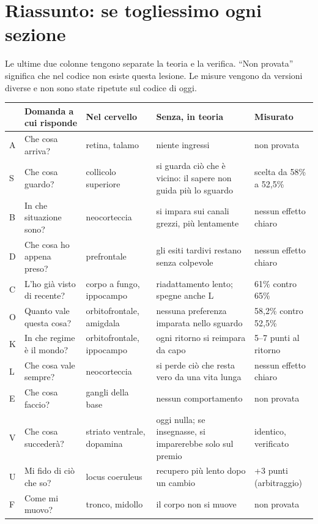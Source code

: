 \documentclass[11pt,a4paper]{article}
\begin{document}
\section{Riassunto: se togliessimo ogni sezione}

Le ultime due colonne tengono separate la teoria e la verifica. ``Non provata'' significa
che nel codice non esiste questa lesione. Le misure vengono da versioni diverse e non sono
state ripetute sul codice di oggi.

\begin{center}
\small
\begin{tabularx}{\textwidth}{@{}lL{3.0cm}L{2.5cm}YL{2.8cm}@{}}
\toprule
& \textbf{Domanda a cui risponde} & \textbf{Nel cervello} & \textbf{Senza, in teoria} & \textbf{Misurato} \\
\midrule
A & Che cosa arriva? & retina, talamo & niente ingressi & non provata \\
S & Che cosa guardo? & collicolo superiore & si guarda ciò che è vicino: il sapere non guida più lo sguardo & scelta da 58\% a 52,5\% \\
B & In che situazione sono? & neocorteccia & si impara sui canali grezzi, più lentamente & nessun effetto chiaro \\
D & Che cosa ho appena preso? & prefrontale & gli esiti tardivi restano senza colpevole & nessun effetto chiaro \\
C & L'ho già visto di recente? & corpo a fungo, ippocampo & riadattamento lento; spegne anche L & 61\% contro 65\% \\
O & Quanto vale questa cosa? & orbitofrontale, amigdala & nessuna preferenza imparata nello sguardo & 58,2\% contro 52,5\% \\
K & In che regime è il mondo? & orbitofrontale, ippocampo & ogni ritorno si reimpara da capo & 5--7 punti al ritorno \\
L & Che cosa vale sempre? & neocorteccia & si perde ciò che resta vero da una vita lunga & nessun effetto chiaro \\
E & Che cosa faccio? & gangli della base & nessun comportamento & non provata \\
V & Che cosa succederà? & striato ventrale, dopamina & oggi nulla; se insegnasse, si imparerebbe solo sul premio & identico, verificato \\
U & Mi fido di ciò che so? & locus coeruleus & recupero più lento dopo un cambio & +3 punti (arbitraggio) \\
F & Come mi muovo? & tronco, midollo & il corpo non si muove & non provata \\
\bottomrule
\end{tabularx}
\end{center}
\end{document}
